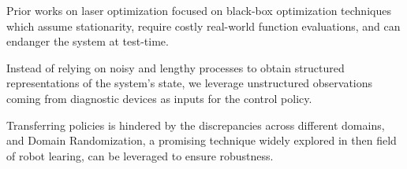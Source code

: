 {Prior works on laser optimization focused on black-box optimization techniques which assume stationarity, require costly real-world function evaluations, and can endanger the system at test-time.}

{Instead of relying on noisy and lengthy processes to obtain structured representations of the system's state, we leverage unstructured observations coming from diagnostic devices as inputs for the control policy.}

{Transferring policies is hindered by the discrepancies across different domains, and Domain Randomization, a promising technique widely explored in then field of robot learing, can be leveraged to ensure robustness.}